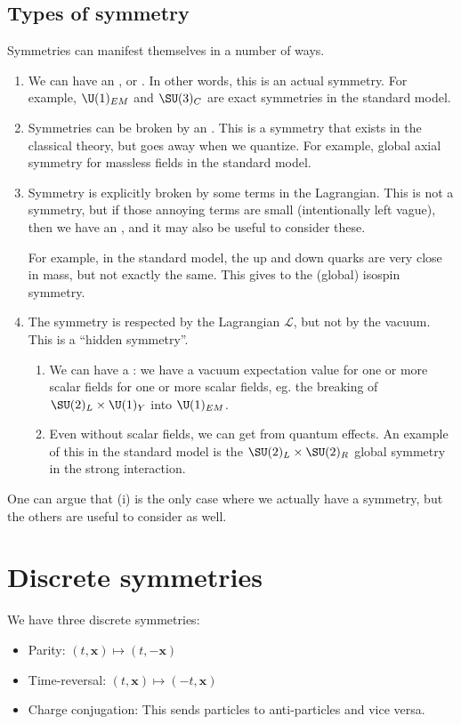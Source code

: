 \documentclass[a4paper]{article}
\begin{document}
\subsection{Types of symmetry}
Symmetries can manifest themselves in a number of ways.
\begin{enumerate}
  \item We can have an , or . In other words, this is an actual symmetry. For example, $\U(1)_{EM}$ and $\SU(3)_C$ are exact symmetries in the standard model.
  \item Symmetries can be broken by an . This is a symmetry that exists in the classical theory, but goes away when we quantize. For example, global axial symmetry for massless fields in the standard model.
  \item Symmetry is explicitly broken by some terms in the Lagrangian. This is not a symmetry, but if those annoying terms are small (intentionally left vague), then we have an , and it may also be useful to consider these.

    For example, in the standard model, the up and down quarks are very close in mass, but not exactly the same. This gives to the (global) isospin symmetry.
  \item The symmetry is respected by the Lagrangian $\mathcal{L}$, but not by the vacuum. This is a ``hidden symmetry''.
    \begin{enumerate}
      \item We can have a : we have a vacuum expectation value for one or more scalar fields for one or more scalar fields, eg. the breaking of $\SU(2)_L \times \U(1)_Y$ into $\U(1)_{EM}$.
      \item Even without scalar fields, we can get  from quantum effects. An example of this in the standard model is the $\SU(2)_L \times \SU(2)_R$ global symmetry in the strong interaction.
    \end{enumerate}
\end{enumerate}
One can argue that (i) is the only case where we actually have a symmetry, but the others are useful to consider as well.

\section{Discrete symmetries}
We have three discrete symmetries:
\begin{itemize}
  \item Parity: $(t, \mathbf{x}) \mapsto (t, -\mathbf{x})$
  \item Time-reversal: $(t, \mathbf{x}) \mapsto (-t, \mathbf{x})$
  \item Charge conjugation: This sends particles to anti-particles and vice versa.
\end{itemize}

\printindex
\end{document}

